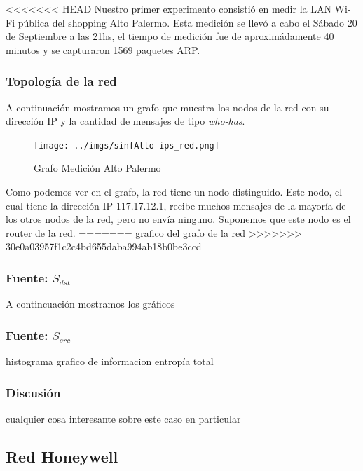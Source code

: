 \documentclass[10pt, a4paper]{article}
\begin{document}
<<<<<<< HEAD
Nuestro primer experimento consistió en medir la LAN Wi-Fi pública del shopping Alto Palermo. Esta medición se llevó a cabo el Sábado 20 de Septiembre a las 21hs, el tiempo de medición fue de aproximádamente 40 minutos y se capturaron 1569 paquetes ARP.


\subsubsection{Topología de la red}

A continuación mostramos un grafo que muestra los nodos de la red con su dirección IP y la cantidad de mensajes de tipo \emph{who-has}.

\begin{figure}
 \begin{center}
  \texttt{[image: ../imgs/sinfAlto-ips\_red.png]}
  \caption{Grafo Medición Alto Palermo}
 \end{center}

\end{figure}

Como podemos ver en el grafo, la red tiene un nodo distinguido. Este nodo, el cual tiene la dirección IP 117.17.12.1, recibe muchos mensajes de la mayoría de los otros nodos de la red, pero no envía ninguno. Suponemos que este nodo es el router de la red.
=======
grafico del grafo de la red
>>>>>>> 30e0a03957f1c2c4bd655daba994ab18b0be3ccd

\subsubsection{Fuente: $S_{dst}$}

A contincuación mostramos los gráficos 

\subsubsection{Fuente: $S_{src}$}

histograma
grafico de informacion
entropía total

\subsubsection{Discusión}

cualquier cosa interesante sobre este caso en particular

\subsection{Red Honeywell}
\end{document}
